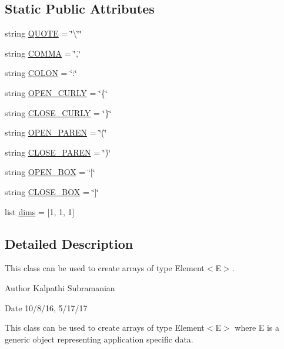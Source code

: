 \subsection*{Static Public Attributes}
\begin{DoxyCompactItemize}
\item 
string \hyperlink{class_bridges_1_1array_1_1_array_ab951298b5e08d36d671ac2ebb2ec21f0}{Q\+U\+O\+T\+E} = \char`\"{}\textbackslash{}\char`\"{}\char`\"{}
\item 
string \hyperlink{class_bridges_1_1array_1_1_array_a97f8cde2e1e74515a69a67656096d80a}{C\+O\+M\+M\+A} = \char`\"{},\char`\"{}
\item 
string \hyperlink{class_bridges_1_1array_1_1_array_adea15d9951eee9606e7d418b42cd958f}{C\+O\+L\+O\+N} = \char`\"{}\+:\char`\"{}
\item 
string \hyperlink{class_bridges_1_1array_1_1_array_ad87cc0cfd0156a197487451a5fa6cdf5}{O\+P\+E\+N\+\_\+\+C\+U\+R\+L\+Y} = \char`\"{}\{\char`\"{}
\item 
string \hyperlink{class_bridges_1_1array_1_1_array_a960d888bd71958177f94980587f2ea01}{C\+L\+O\+S\+E\+\_\+\+C\+U\+R\+L\+Y} = \char`\"{}\}\char`\"{}
\item 
string \hyperlink{class_bridges_1_1array_1_1_array_a4723c84ca43546eba24b5c2ba3de2526}{O\+P\+E\+N\+\_\+\+P\+A\+R\+E\+N} = \char`\"{}(\char`\"{}
\item 
string \hyperlink{class_bridges_1_1array_1_1_array_a63342b7c783a1a7729f42fbaf8dba8e4}{C\+L\+O\+S\+E\+\_\+\+P\+A\+R\+E\+N} = \char`\"{})\char`\"{}
\item 
string \hyperlink{class_bridges_1_1array_1_1_array_a19b356b6f6898f9a28f1c7f80b90836e}{O\+P\+E\+N\+\_\+\+B\+O\+X} = \char`\"{}\mbox{[}\char`\"{}
\item 
string \hyperlink{class_bridges_1_1array_1_1_array_a72052b359259458c2d4ce29e796d7a59}{C\+L\+O\+S\+E\+\_\+\+B\+O\+X} = \char`\"{}\mbox{]}\char`\"{}
\item 
list \hyperlink{class_bridges_1_1array_1_1_array_ac037f96fff9569134da9d66e33bc1f0f}{dims} = \mbox{[}1, 1, 1\mbox{]}
\end{DoxyCompactItemize}


\subsection{Detailed Description}
This class can be used to create arrays of type Element$<$\+E$>$. 

\begin{DoxyAuthor}{Author}
Kalpathi Subramanian
\end{DoxyAuthor}
\begin{DoxyDate}{Date}
10/8/16, 5/17/17
\end{DoxyDate}
This class can be used to create arrays of type Element$<$\+E$>$ where E is a generic object representing application specific data.

